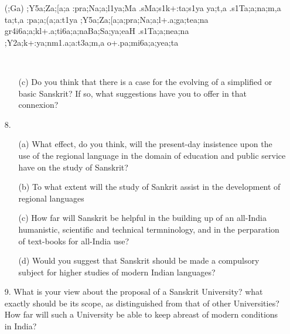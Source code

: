 \begin{spacing}{1.15}
\begin{itemize}
\begin{itemize}
 \item[({\sktf ;Ga})] {\ZF{-};Y5a;Za;[a;a%
\ZF{-}:pra;Na;a;l1ya;Ma .sMa;s1k+:ta;s1ya ya;t,a
.s1Ta;a;na;m,a\ZF{,} ta;t,a :pa;a;(a;a:t1ya%
\ZF{-};Y5a;Za;[a;a;pra;Na;a;l+.a;ga;tea;na
gr4i6a;a;k\ZF{-}l+.a;ti6a;a;na\ZF{-}Ba;Sa;ya;eaH .s1Ta;a;nea;na
;Y2a;k+:ya;nm1.a;a:t3a;m,a o+.pa;mi6a;a;yea;ta } 
                               
 \end{itemize} 
\end{itemize} 
\end{spacing}
           
{\rm 
\begin{itemize} 
\item[~]
\begin{itemize}
\item[(c)]  Do you think that there is a case for the evolving of a simplified or basic Sanskrit? If so, what suggestions have you to offer in that connexion?
            \end{itemize}

 \item[8.] \begin{itemize}
           \item[(a)] What effect, do you think, will the present-day insistence upon the use of the regional language in the domain of education and public service have on the study of Sanskrit? 
            
          \item[(b)] To what extent will the study of Sankrit assist in the development of regional languages %

         \item[(c)] How far will Sanskrit be helpful in the building up of an all-India humanistic, scientific and technical termninology, and in the perparation of text-books for all-India use?
            
        \item[(d)] Would you suggest that Sanskrit should be made a compulsory subject for higher studies of modern Indian languages?
       \end{itemize}   
             
\item[9.] What is your view about the proposal of a Sanskrit University? what exactly should be its scope, as distinguished from that of other Universities?  How far will such a University be able to keep abreast of modern conditions in India?                      
\end{itemize}
}

